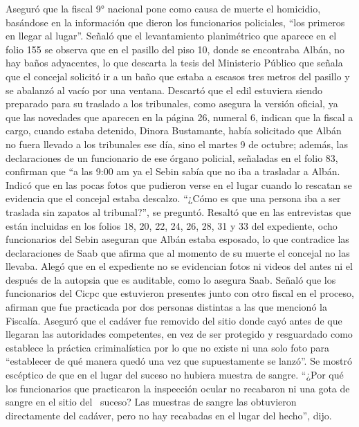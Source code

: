 \documentclass{article}%
\begin{document}
\newline%
%
Aseguró que la fiscal 9° nacional pone como causa de muerte el homicidio, basándose en la información que dieron los funcionarios policiales, “los primeros en llegar al lugar”.%
\newline%
%
Señaló que el levantamiento planimétrico que aparece en el folio 155 se observa que en el pasillo del piso 10, donde se encontraba Albán, no hay baños adyacentes, lo que descarta la tesis del Ministerio Público que señala que el concejal solicitó ir a un baño que estaba a escasos tres metros del pasillo y se abalanzó al vacío por una ventana. Descartó que el edil estuviera siendo preparado para su traslado a los tribunales, como asegura la versión oficial, ya que las novedades que aparecen en la página 26, numeral 6, indican que la fiscal a cargo, cuando estaba detenido, Dinora Bustamante, había solicitado que Albán no fuera llevado a los tribunales ese día, sino el martes 9 de octubre; además, las declaraciones de un funcionario de ese órgano policial, señaladas en el folio 83, confirman que “a las 9:00 am ya el Sebin sabía que no iba a trasladar a Albán.%
\newline%
%
Indicó que en las pocas fotos que pudieron verse en el lugar cuando lo rescatan se evidencia que el concejal estaba descalzo. “¿Cómo es que una persona iba a ser traslada sin zapatos al tribunal?”, se preguntó.%
\newline%
%
Resaltó que en las entrevistas que están incluidas en los folios 18, 20, 22, 24, 26, 28, 31 y 33 del expediente, ocho funcionarios del Sebin aseguran que Albán estaba esposado, lo que contradice las declaraciones de Saab que afirma que al momento de su muerte el concejal no las llevaba.%
\newline%
%
Alegó que en el expediente no se evidencian fotos ni videos del antes ni el después de la autopsia que es auditable, como lo asegura Saab. Señaló que los funcionarios del Cicpc que estuvieron presentes junto con otro fiscal en el proceso, afirman que fue practicada por dos personas distintas a las que mencionó la Fiscalía.%
\newline%
%
Aseguró que el cadáver fue removido del sitio donde cayó antes de que llegaran las autoridades competentes, en vez de ser protegido y resguardado como establece la práctica criminalística por lo que no existe ni una solo foto para “establecer de qué manera quedó una vez que supuestamente se lanzó”.%
\newline%
%
Se mostró escéptico de que en el lugar del suceso no hubiera muestra de sangre. “¿Por qué los funcionarios que practicaron la inspección ocular no recabaron ni una gota de sangre en el sitio del ~suceso? Las muestras de sangre las obtuvieron directamente del cadáver, pero no hay recabadas en el lugar del hecho”, dijo.%
\end{document}
